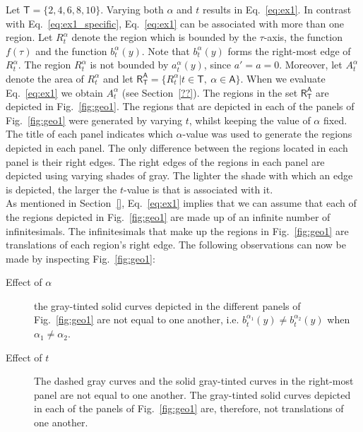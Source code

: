 \documentclass[twoside,reqno,11pt]{fcaa-var} %
\begin{document}

\noindent
Let $\mathsf{T}=\{2,4,6,8,10\}$. Varying both $\alpha$ and $t$ results in Eq.~\eqref{eq:ex1}. In contrast with Eq.~\eqref{eq:ex1_specific}, Eq.~\eqref{eq:ex1} can be associated with more than one region. 
Let $R_{t}^{\alpha}$ denote the region which is bounded by the $\tau$-axis, the function $f(\tau)$ and the function $b_{t}^{\alpha}(y)$. Note that $b_{t}^{\alpha}(y)$ forms the 
right-most edge of $R_{t}^{\alpha}$. The region $R_{t}^{\alpha}$ is not bounded by $a_{t}^{\alpha}(y)$, since $a'=a=0$. Moreover, let $A_{t}^{\alpha}$ denote the area of $R_{t}^{\alpha}$ and let $\mathsf{R}_{\mathsf{T}}^{\mathsf{A}}=\{R_t^{\alpha}|t\in\mathsf{T},~\alpha\in\mathsf{A}\}$. When we evaluate Eq.~\eqref{eq:ex1} we obtain $A_{t}^{\alpha}$ (see Section~\ref{??}). The regions in the set $\mathsf{R}_{\mathsf{T}}^{\mathsf{A}}$ are depicted in Fig.~\ref{fig:geo1}. The regions that are depicted in each of the panels of Fig.~\ref{fig:geo1} were generated by varying $t$, whilst keeping the value of $\alpha$ fixed. The title of each panel indicates which $\alpha$-value was used to generate the regions depicted in each panel. The only difference between the regions located in each 
panel is their right edges. The right edges of the regions in each panel are depicted using varying shades of gray. The lighter the shade with which an edge is depicted, 
the larger the $t$-value is that is associated with it.\\

\noindent
As mentioned in Section~\ref{}, Eq.~\eqref{eq:ex1} implies that we can assume that each of the regions depicted in Fig.~\ref{fig:geo1} are made up of an infinite number of infinitesimals. The infinitesimals that make up the regions in Fig.~\ref{fig:geo1} are translations of each region's right edge. The following observations can now be made by inspecting Fig.~\ref{fig:geo1}: 
\begin{description}
 \item[Effect of $\alpha$] the gray-tinted solid curves depicted in the different panels of Fig.~\ref{fig:geo1} are not equal to one another, i.e. $b_{t}^{\alpha_1}(y)\neq b_{t}^{\alpha_2}(y)$ when $\alpha_1\neq\alpha_2$. 
 \item[Effect of $t$] The dashed gray curves and the solid gray-tinted curves in the right-most panel are not equal to one another. The gray-tinted solid curves depicted in each of the panels of Fig.~\ref{fig:geo1} are, therefore, not translations of one another.
\end{description}
\end{document}
